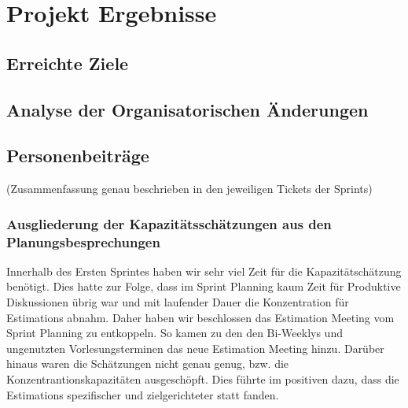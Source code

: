 
\chapter{Projekt Ergebnisse}

\section{Erreichte Ziele}

\section{Analyse der Organisatorischen Änderungen}
\section{Personenbeiträge}
(Zusammenfassung genau beschrieben in den jeweiligen Tickets der Sprints)

\subsection{Ausgliederung der Kapazitätsschätzungen aus den Planungsbesprechungen}

Innerhalb des Ersten Sprintes haben wir sehr viel Zeit für die Kapazitätschätzung benötigt. 
Dies hatte zur Folge, dass im Sprint Planning kaum Zeit für Produktive Diskussionen übrig war und mit laufender Dauer die Konzentration für Estimations abnahm.
Daher haben wir beschlossen das Estimation Meeting vom Sprint Planning zu entkoppeln. So kamen zu den den Bi-Weeklys und ungenutzten Vorlesungsterminen das neue Estimation Meeting hinzu.
Darüber hinaus waren die Schätzungen nicht genau genug, bzw. die Konzentrantionskapazitäten ausgeschöpft.
Dies führte im positiven dazu, dass die Estimations spezifischer und zielgerichteter statt fanden.